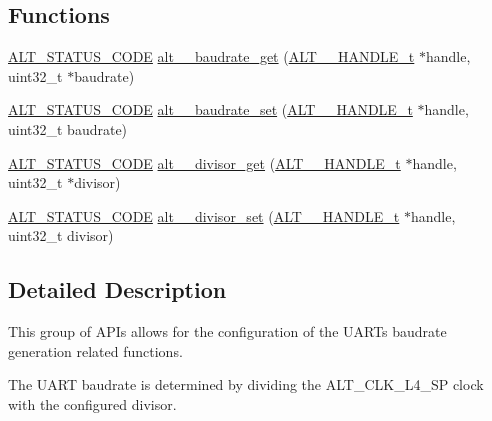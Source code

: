 \subsection*{Functions}
\begin{DoxyCompactItemize}
\item 
\mbox{\hyperlink{hwlib_8h_abdb0d369f069723ca55d6c94bcaaaa12}{A\+L\+T\+\_\+\+S\+T\+A\+T\+U\+S\+\_\+\+C\+O\+DE}} \mbox{\hyperlink{group__UART__BAUD_gaf4798296ba16e4f61ec5c1eadcc486cf}{alt\+\_\+\_\+baudrate\+\_\+get}} (\mbox{\hyperlink{group__UART__BASIC_ga4173f362f19fc04032c3859b78d78119}{A\+L\+T\+\_\+\_\+\+H\+A\+N\+D\+L\+E\+\_\+t}} $\ast$handle, uint32\+\_\+t $\ast$baudrate)
\item 
\mbox{\hyperlink{hwlib_8h_abdb0d369f069723ca55d6c94bcaaaa12}{A\+L\+T\+\_\+\+S\+T\+A\+T\+U\+S\+\_\+\+C\+O\+DE}} \mbox{\hyperlink{group__UART__BAUD_gaf474e6f132a8e9f57d3d3e279e1115bd}{alt\+\_\+\_\+baudrate\+\_\+set}} (\mbox{\hyperlink{group__UART__BASIC_ga4173f362f19fc04032c3859b78d78119}{A\+L\+T\+\_\+\_\+\+H\+A\+N\+D\+L\+E\+\_\+t}} $\ast$handle, uint32\+\_\+t baudrate)
\item 
\mbox{\hyperlink{hwlib_8h_abdb0d369f069723ca55d6c94bcaaaa12}{A\+L\+T\+\_\+\+S\+T\+A\+T\+U\+S\+\_\+\+C\+O\+DE}} \mbox{\hyperlink{group__UART__BAUD_ga76cab18489cdfb3004f67ba27037aa2e}{alt\+\_\+\_\+divisor\+\_\+get}} (\mbox{\hyperlink{group__UART__BASIC_ga4173f362f19fc04032c3859b78d78119}{A\+L\+T\+\_\+\_\+\+H\+A\+N\+D\+L\+E\+\_\+t}} $\ast$handle, uint32\+\_\+t $\ast$divisor)
\item 
\mbox{\hyperlink{hwlib_8h_abdb0d369f069723ca55d6c94bcaaaa12}{A\+L\+T\+\_\+\+S\+T\+A\+T\+U\+S\+\_\+\+C\+O\+DE}} \mbox{\hyperlink{group__UART__BAUD_gaed60736b0e13f244e730703f0fa55e24}{alt\+\_\+\_\+divisor\+\_\+set}} (\mbox{\hyperlink{group__UART__BASIC_ga4173f362f19fc04032c3859b78d78119}{A\+L\+T\+\_\+\_\+\+H\+A\+N\+D\+L\+E\+\_\+t}} $\ast$handle, uint32\+\_\+t divisor)
\end{DoxyCompactItemize}


\subsection{Detailed Description}
This group of A\+P\+Is allows for the configuration of the U\+A\+RT\textquotesingle{}s baudrate generation related functions.

The U\+A\+RT baudrate is determined by dividing the A\+L\+T\+\_\+\+C\+L\+K\+\_\+\+L4\+\_\+\+SP clock with the configured divisor. 

